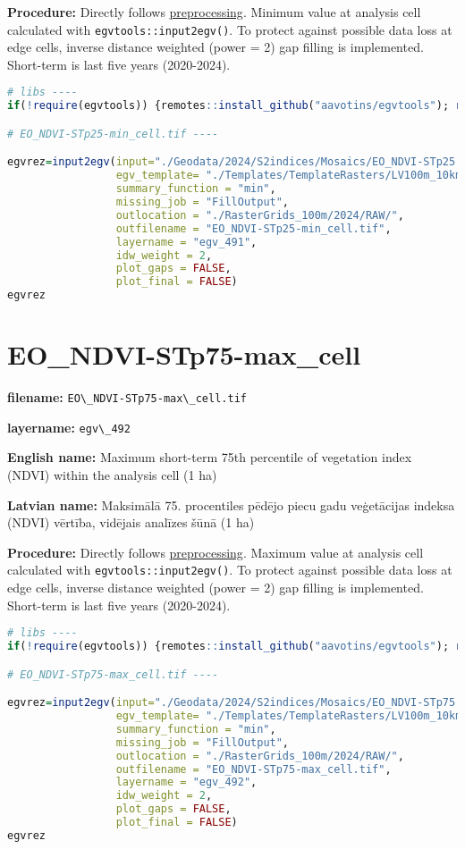 \documentclass[
]{book}
\newcommand{\passthrough}[1]{#1}
\begin{document}
\textbf{Procedure:} Directly follows \hyperref[Ch04.13]{preprocessing}. Minimum value at analysis cell
calculated with \passthrough{\lstinline!egvtools::input2egv()!}. To protect against possible data loss at edge cells,
inverse distance weighted (power = 2) gap filling is implemented. Short-term is last five years (2020-2024).

\begin{lstlisting}[language=R]
# libs ----
if(!require(egvtools)) {remotes::install_github("aavotins/egvtools"); require(egvtools)}

# EO_NDVI-STp25-min_cell.tif ----

egvrez=input2egv(input="./Geodata/2024/S2indices/Mosaics/EO_NDVI-STp25.tif",
                 egv_template= "./Templates/TemplateRasters/LV100m_10km.tif",
                 summary_function = "min",
                 missing_job = "FillOutput",
                 outlocation = "./RasterGrids_100m/2024/RAW/",
                 outfilename = "EO_NDVI-STp25-min_cell.tif",
                 layername = "egv_491",
                 idw_weight = 2,
                 plot_gaps = FALSE,
                 plot_final = FALSE)
egvrez
\end{lstlisting}

\section{EO\_NDVI-STp75-max\_cell}\label{ch06.492}

\textbf{filename:} \passthrough{\lstinline!EO\_NDVI-STp75-max\_cell.tif!}

\textbf{layername:} \passthrough{\lstinline!egv\_492!}

\textbf{English name:} Maximum short-term 75th percentile of vegetation index (NDVI) within the analysis cell (1 ha)

\textbf{Latvian name:} Maksimālā 75. procentiles pēdējo piecu gadu veģetācijas indeksa (NDVI) vērtība, vidējais analīzes šūnā (1 ha)

\textbf{Procedure:} Directly follows \hyperref[Ch04.13]{preprocessing}. Maximum value at analysis cell
calculated with \passthrough{\lstinline!egvtools::input2egv()!}. To protect against possible data loss at edge cells,
inverse distance weighted (power = 2) gap filling is implemented. Short-term is last five years (2020-2024).

\begin{lstlisting}[language=R]
# libs ----
if(!require(egvtools)) {remotes::install_github("aavotins/egvtools"); require(egvtools)}

# EO_NDVI-STp75-max_cell.tif ----

egvrez=input2egv(input="./Geodata/2024/S2indices/Mosaics/EO_NDVI-STp75.tif",
                 egv_template= "./Templates/TemplateRasters/LV100m_10km.tif",
                 summary_function = "min",
                 missing_job = "FillOutput",
                 outlocation = "./RasterGrids_100m/2024/RAW/",
                 outfilename = "EO_NDVI-STp75-max_cell.tif",
                 layername = "egv_492",
                 idw_weight = 2,
                 plot_gaps = FALSE,
                 plot_final = FALSE)
egvrez
\end{lstlisting}
\end{document}
